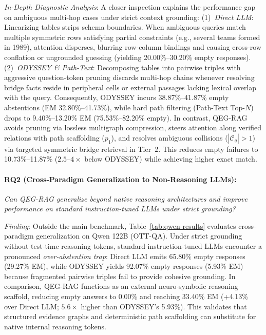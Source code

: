 \documentclass[runningheads]{llncs}
\begin{document}
\emph{In-Depth Diagnostic Analysis}: A closer inspection explains the performance gap on ambiguous multi-hop cases under strict context grounding:
(1)~\emph{Direct LLM}: Linearizing tables strips schema boundaries. When ambiguous queries match multiple symmetric rows satisfying partial constraints (e.g., several teams formed in 1989), attention disperses, blurring row-column bindings and causing cross-row conflation or ungrounded guessing (yielding 20.00\%--30.20\% empty responses).
(2)~\emph{ODYSSEY \& Path-Text}: Decomposing tables into pairwise triples with aggressive question-token pruning discards multi-hop chains whenever resolving bridge facts reside in peripheral cells or external passages lacking lexical overlap with the query. Consequently, ODYSSEY incurs 38.87\%--41.87\% empty abstentions (EM 32.80\%--41.73\%), while hard path filtering (Path-Text Top-$N$) drops to 9.40\%--13.20\% EM (75.53\%--82.20\% empty).
In contrast, QEG-RAG avoids pruning via lossless multigraph compression, steers attention along verified relations with path scaffolding ($p_1$), and resolves ambiguous collisions ($|\mathcal{C}_q| > 1$) via targeted symmetric bridge retrieval in Tier~2. This reduces empty failures to 10.73\%--11.87\% ($2.5\text{--}4\times$ below ODYSSEY) while achieving higher exact match.

\paragraph{RQ2 (Cross-Paradigm Generalization to Non-Reasoning LLMs):}
\emph{Can QEG-RAG generalize beyond native reasoning architectures and improve performance on standard instruction-tuned LLMs under strict grounding?}

\emph{Finding}: Outside the main benchmark, Table~\ref{tab:qwen-results} evaluates cross-paradigm generalization on Qwen 122B (OTT-QA). Under strict grounding without test-time reasoning tokens, standard instruction-tuned LLMs encounter a pronounced \emph{over-abstention trap}: Direct LLM emits 65.80\% empty responses (29.27\% EM), while ODYSSEY yields 92.07\% empty responses (5.93\% EM) because fragmented pairwise triples fail to provide cohesive grounding. In comparison, QEG-RAG functions as an external neuro-symbolic reasoning scaffold, reducing empty answers to 0.00\% and reaching 33.40\% EM (+4.13\% over Direct LLM; $5.6\times$ higher than ODYSSEY's 5.93\%). This validates that structured evidence graphs and deterministic path scaffolding can substitute for native internal reasoning tokens.
\end{document}

